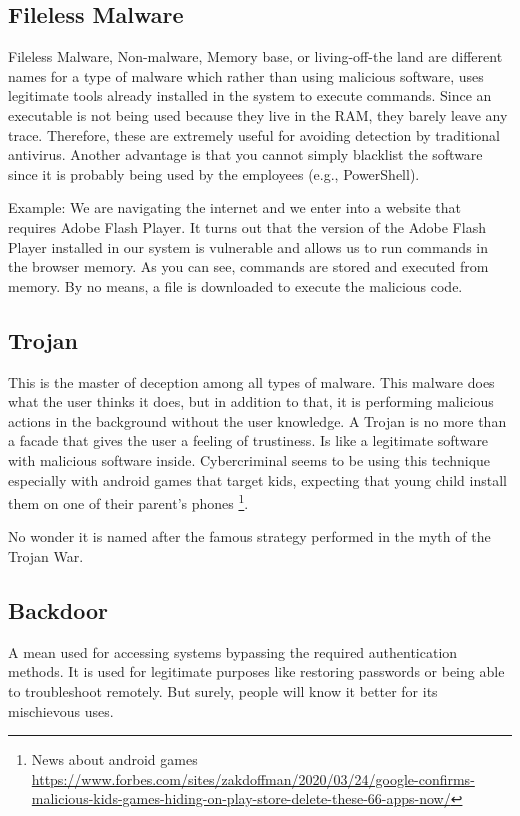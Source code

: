\documentclass[11pt, a4paper,twoside]{tesi_upf}
\begin{document}
\subsection{Fileless Malware}

Fileless Malware, Non-malware, Memory base, or living-off-the land are different names for a type of malware which rather than using malicious software, uses legitimate tools already installed in the system to execute commands. Since an executable is not being used because they live in the RAM, they barely leave any trace. Therefore, these are extremely useful for avoiding detection by traditional antivirus. Another advantage is that you cannot simply blacklist the software since it is probably being used by the employees (e.g., PowerShell).

Example: We are navigating the internet and we enter into a website that requires Adobe Flash Player. It turns out that the version of the Adobe Flash Player installed in our system is vulnerable and allows us to run commands in the browser memory. As you can see, commands are stored and executed from memory. By no means, a file is downloaded to execute the malicious code.

\subsection{Trojan}

This is the master of deception among all types of malware. This malware does what the user thinks it does, but in addition to that, it is performing malicious actions in the background without the user knowledge.
A Trojan is no more than a facade that gives the user a feeling of trustiness. Is like a legitimate software with malicious software inside. Cybercriminal seems to be using this technique especially with android games that target kids, expecting that young child install them on one of their parent's phones
\footnote{News about android games \url{https://www.forbes.com/sites/zakdoffman/2020/03/24/google-confirms-malicious-kids-games-hiding-on-play-store-delete-these-66-apps-now/}}.

No wonder it is named after the famous strategy performed in the myth of the Trojan War.

\subsection{Backdoor}

A mean used for accessing systems bypassing the required authentication methods. It is used for legitimate purposes like restoring passwords or being able to troubleshoot remotely. But surely, people will know it better for its mischievous uses.
\end{document}
